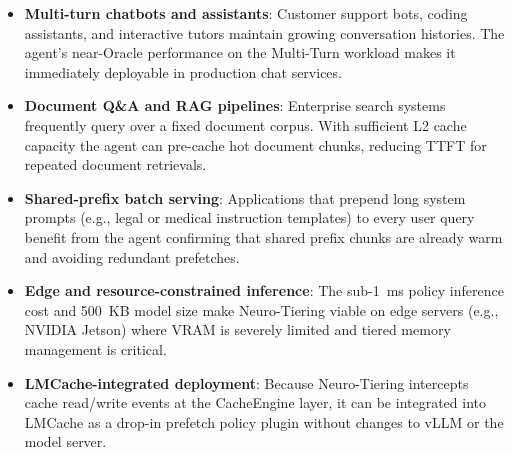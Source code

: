 \documentclass[conference]{IEEEtran}
\begin{document}
\begin{itemize}
    \item \textbf{Multi-turn chatbots and assistants}: Customer support bots, coding assistants, and interactive tutors maintain growing conversation histories. The agent's near-Oracle performance on the Multi-Turn workload makes it immediately deployable in production chat services.
    \item \textbf{Document Q\&A and RAG pipelines}: Enterprise search systems frequently query over a fixed document corpus. With sufficient L2 cache capacity the agent can pre-cache hot document chunks, reducing TTFT for repeated document retrievals.
    \item \textbf{Shared-prefix batch serving}: Applications that prepend long system prompts (e.g., legal or medical instruction templates) to every user query benefit from the agent confirming that shared prefix chunks are already warm and avoiding redundant prefetches.
    \item \textbf{Edge and resource-constrained inference}: The sub-1~ms policy inference cost and 500~KB model size make Neuro-Tiering viable on edge servers (e.g., NVIDIA Jetson) where VRAM is severely limited and tiered memory management is critical.
    \item \textbf{LMCache-integrated deployment}: Because Neuro-Tiering intercepts cache read/write events at the CacheEngine layer, it can be integrated into LMCache as a drop-in prefetch policy plugin without changes to vLLM or the model server.
\end{itemize}
\end{document}
